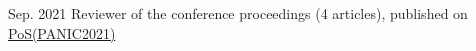 
\begin{cventries}
    
    {}
    {}{Sep. 2021}
    {Reviewer of the conference proceedings (4 articles), published on \href{https://pos.sissa.it/380/}{PoS(PANIC2021)}}
\end{cventries}